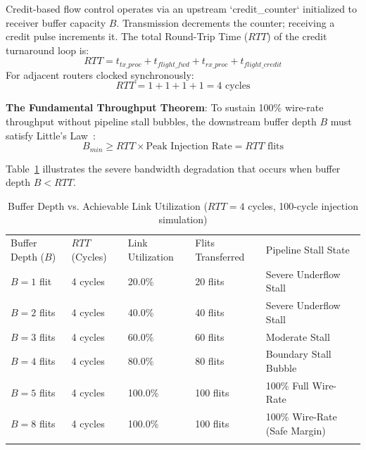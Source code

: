 Credit-based flow control operates via an upstream `credit\_counter` initialized to receiver buffer capacity $B$. Transmission decrements the counter; receiving a credit pulse increments it. The total Round-Trip Time ($RTT$) of the credit turnaround loop is:
\begin{equation}
RTT = t_{tx\_proc} + t_{flight\_fwd} + t_{rx\_proc} + t_{flight\_credit}
\label{eq:rtt_loop}
\end{equation}
For adjacent routers clocked synchronously:
\begin{equation}
RTT = 1 + 1 + 1 + 1 = 4\text{ cycles}
\end{equation}

\begin{svgraybox}
\textbf{The Fundamental Throughput Theorem}: To sustain 100\% wire-rate throughput without pipeline stall bubbles, the downstream buffer depth $B$ must satisfy Little's Law~\cite{Little1961,DallyPrinciples}:
\begin{equation}
B_{min} \ge RTT \times \text{Peak Injection Rate} = RTT\text{ flits}
\label{eq:bmin_theorem}
\end{equation}
\end{svgraybox}

Table~\ref{tab:buffer_depth_utilization} illustrates the severe bandwidth degradation that occurs when buffer depth $B < RTT$.

\begin{table}[t]
\caption{Buffer Depth vs. Achievable Link Utilization ($RTT = 4$ cycles, 100-cycle injection simulation)}
\label{tab:buffer_depth_utilization}
\begin{tabular}{p{2.8cm}p{1.8cm}p{2.2cm}p{2.2cm}p{2.6cm}}
\hline\noalign{\smallskip}
Buffer Depth ($B$) & $RTT$ (Cycles) & Link Utilization & Flits Transferred & Pipeline Stall State \\
\noalign{\smallskip}\svhline\noalign{\smallskip}
$B = 1$ flit  & 4 cycles & 20.0\%  & 20 flits  & Severe Underflow Stall \\
$B = 2$ flits & 4 cycles & 40.0\%  & 40 flits  & Severe Underflow Stall \\
$B = 3$ flits & 4 cycles & 60.0\%  & 60 flits  & Moderate Stall \\
$B = 4$ flits & 4 cycles & 80.0\%  & 80 flits  & Boundary Stall Bubble \\
$B = 5$ flits & 4 cycles & 100.0\% & 100 flits & 100\% Full Wire-Rate \\
$B = 8$ flits & 4 cycles & 100.0\% & 100 flits & 100\% Wire-Rate (Safe Margin) \\
\noalign{\smallskip}\hline\noalign{\smallskip}
\end{tabular}
\end{table}

